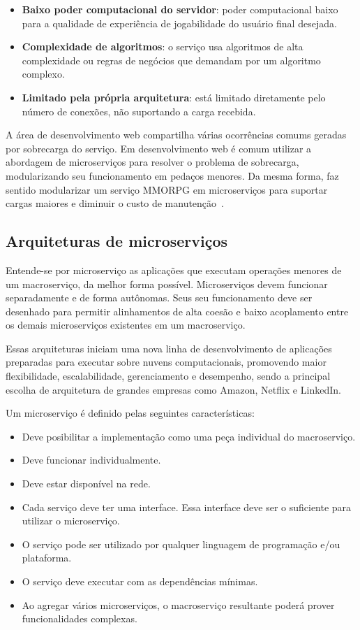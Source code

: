 \begin{itemize}
  \item \textbf{Baixo poder computacional do servidor}: poder computacional baixo para a qualidade de experiência de jogabilidade do usuário final desejada.
  \item \textbf{Complexidade de algoritmos}: o serviço usa algoritmos de alta complexidade ou regras de negócios que demandam por um algoritmo complexo.
  \item \textbf{Limitado pela própria arquitetura}: está limitado diretamente pelo número de conexões, não suportando a carga recebida.
\end{itemize}

A área de desenvolvimento web compartilha várias ocorrências comums geradas por sobrecarga do serviço\cite{7830692}.
%
Em desenvolvimento web é comum utilizar a abordagem de microserviços para resolver o problema de sobrecarga, modularizando seu funcionamento em pedaços menores.
%
Da mesma forma, faz sentido modularizar um serviço \ac{MMORPG} em microserviços para suportar cargas maiores e diminuir o custo de manutenção~\cite{7515686}.

\subsection{Arquiteturas de microserviços}

Entende-se por microserviço as aplicações que executam operações menores de um macroserviço, da melhor forma possível\cite{stephenclarkewillson2017}.
%
Microserviços devem funcionar separadamente e de forma autônomas.
%
Seus seu funcionamento deve ser desenhado para permitir alinhamentos de alta coesão e baixo acoplamento entre os demais microserviços existentes em um macroserviço\cite{8169955}.



Essas arquiteturas iniciam uma nova linha de desenvolvimento de aplicações preparadas para executar sobre nuvens computacionais, promovendo maior flexibilidade, escalabilidade, gerenciamento e desempenho, sendo a principal escolha de arquitetura de grandes empresas como Amazon, Netflix e LinkedIn\cite{7830692}\cite{7515686}.

Um microserviço é definido pelas seguintes características\cite{8169955}:

\begin{itemize}
  \item Deve posibilitar a implementação como uma peça individual do macroserviço.
  \item Deve funcionar individualmente.
  \item Deve estar disponível na rede.
  \item Cada serviço deve ter uma interface. Essa interface deve ser o suficiente para utilizar o microserviço.
  \item O serviço pode ser utilizado por qualquer linguagem de programação e/ou plataforma.
  \item O serviço deve executar com as dependências mínimas.
  \item Ao agregar vários microserviços, o macroserviço resultante poderá prover funcionalidades complexas.
\end{itemize}


